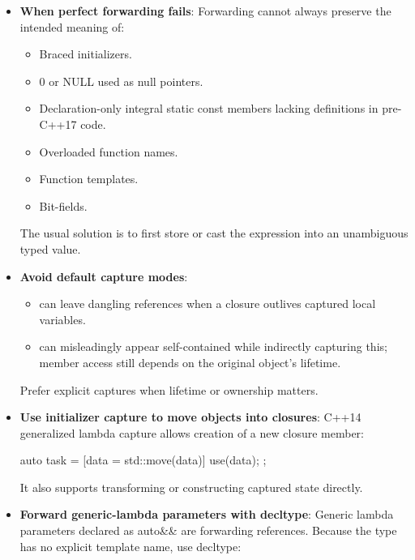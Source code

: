 \documentclass{report}
\begin{document}
\begin{itemize}
\begin{enumerate}
                \item The move operation is not usable.
                \item A library chooses copying to preserve exception guarantees.
            \end{enumerate}
            Small or fixed-size objects may also be no cheaper to move than to copy.
        \item \textbf{When perfect forwarding fails}:  Forwarding cannot always preserve the intended meaning of:
            \begin{itemize}
                \item Braced initializers.
                \item 0 or NULL used as null pointers.
                \item Declaration-only integral static const members lacking definitions in pre-C++17 code.
                \item Overloaded function names.
                \item Function templates.
                \item Bit-fields.
            \end{itemize}
            The usual solution is to first store or cast the expression into an unambiguous typed value.
        \item \textbf{Avoid default capture modes}: 
            \begin{itemize}
                \item [\&] can leave dangling references when a closure outlives captured local variables.
                \item [=] can misleadingly appear self-contained while indirectly capturing this; member access still depends on the original object’s lifetime.
            \end{itemize}
            Prefer explicit captures when lifetime or ownership matters.
        \item \textbf{Use initializer capture to move objects into closures}: C++14 generalized lambda capture allows creation of a new closure member:
            \bigbreak \noindent 
            \begin{cppcode}
                auto task = [data = std::move(data)] {
                    use(data);
                };
            \end{cppcode}
            \bigbreak \noindent 
            It also supports transforming or constructing captured state directly.
        \item \textbf{Forward generic-lambda parameters with decltype}: Generic lambda parameters declared as auto\&\& are forwarding references. Because the type has no explicit template name, use decltype:

\end{itemize}
\end{document}
